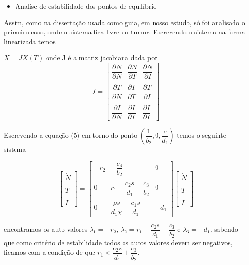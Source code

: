 \documentclass[12pt, a4paper]{article}
\begin{document}
\begin{itemize}
\item Analise de estabilidade dos pontos de equilíbrio
\end{itemize}

Assim, como na dissertação usada como guia, em nosso estudo, só foi analisado o primeiro caso, onde o sistema fica livre do tumor. Escrevendo o sistema na forma linearizada temos

\begin{center}
$ \dot X = JX(T)$ onde J é a matriz jacobiana dada por\\
$$
J=
\left[ 
\begin{array}{ccc}
\dfrac{\partial N}{\partial N} & \dfrac{\partial N}{\partial T} & \dfrac{\partial N}{\partial I} \\ \\
\dfrac{\partial T}{\partial N} & \dfrac{\partial T}{\partial T} & \dfrac{\partial T}{\partial I} \\ \\
\dfrac{\partial I}{\partial N} & \dfrac{\partial I}{\partial T} & \dfrac{\partial I}{\partial I} 
\end{array}  
\right]
$$
\end{center}

Escrevendo a equação (5) em torno do ponto $(\dfrac{1}{b_2}, 0, \dfrac{s}{d_1})$ temos o seguinte sistema

$$
\left[ 
\begin{array}{c}
\dot{N} \\ \\
\dot{T} \\ \\
\dot{I}
\end{array}  
\right]
=
\left[ 
\begin{array}{ccc}
-r_2 & -\dfrac{c_4}{b_2} & 0 \\ \\
0 & r_1 - \dfrac{c_2 s}{d_1} - \dfrac{c_3}{b_2} & 0 \\ \\
0 & \dfrac{\rho s}{d_1 \chi} - \dfrac{c_1 s}{d_1} & -d_1 
\end{array}  
\right]
\left[ 
\begin{array}{c}
\dot{N} \\ \\
\dot{T} \\ \\
\dot{I}
\end{array}  
\right]
$$

encontramos os auto valores $\lambda_1 = -r_2$, $\lambda_2 = r_1 - \dfrac{c_2 s}{d_1} - \dfrac{c_3}{b_2}$ e $\lambda_3 = -d_1$, sabendo que como critério de estabilidade todos os autos valores devem ser negativos, ficamos com a condição de que $r_1 < \dfrac{c_2 s}{d_1} + \dfrac{c_3}{b_2}$.
\end{document}
